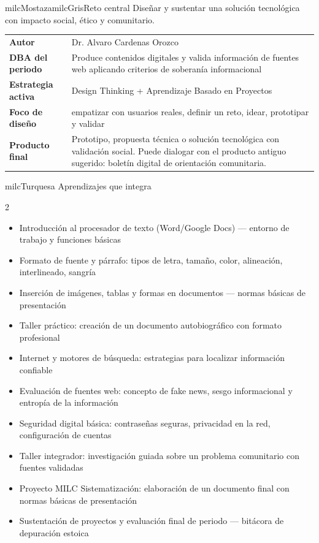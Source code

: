 \documentclass[11pt,letterpaper]{article}
\begin{document}
\begin{softbox}{milcMostaza}{milcGris}{Reto central}
Diseñar y sustentar una solución tecnológica con impacto social, ético y comunitario.
\end{softbox}

\begin{tabularx}{\textwidth}{>{\bfseries}p{3.4cm}X}
\rowcolor{milcMagenta!12}Autor & Dr. Alvaro Cardenas Orozco\\
DBA del periodo & Produce contenidos digitales y valida información de fuentes web aplicando criterios de soberanía informacional\\
Estrategia activa & Design Thinking + Aprendizaje Basado en Proyectos\\
Foco de diseño & empatizar con usuarios reales, definir un reto, idear, prototipar y validar\\
Producto final & Prototipo, propuesta técnica o solución tecnológica con validación social. Puede dialogar con el producto antiguo sugerido: boletín digital de orientación comunitaria.\\
\end{tabularx}

\begin{titlebox}{milcTurquesa}
Aprendizajes que integra
\end{titlebox}
\begin{multicols}{2}
\begin{itemize}[leftmargin=*]
\item Introducción al procesador de texto (Word/Google Docs) — entorno de trabajo y funciones básicas
\item Formato de fuente y párrafo: tipos de letra, tamaño, color, alineación, interlineado, sangría
\item Inserción de imágenes, tablas y formas en documentos — normas básicas de presentación
\item Taller práctico: creación de un documento autobiográfico con formato profesional
\item Internet y motores de búsqueda: estrategias para localizar información confiable
\item Evaluación de fuentes web: concepto de fake news, sesgo informacional y entropía de la información
\item Seguridad digital básica: contraseñas seguras, privacidad en la red, configuración de cuentas
\item Taller integrador: investigación guiada sobre un problema comunitario con fuentes validadas
\item Proyecto MILC Sistematización: elaboración de un documento final con normas básicas de presentación
\item Sustentación de proyectos y evaluación final de periodo — bitácora de depuración estoica
\end{itemize}
\end{multicols}
\end{document}
